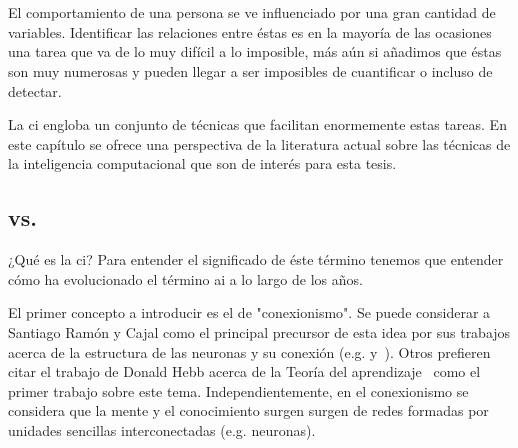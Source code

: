 \chapter{}
\label{ch:sota-ci}

El comportamiento de una persona se ve influenciado por una gran cantidad de variables. Identificar las relaciones entre éstas es en la mayoría de las ocasiones una tarea que va de lo muy difícil a lo imposible, más aún si añadimos que éstas son muy numerosas y pueden llegar a ser imposibles de cuantificar o incluso de detectar.

La \ac{ci} engloba un conjunto de técnicas que facilitan enormemente estas tareas. En este capítulo se ofrece una perspectiva de la literatura actual sobre las técnicas de la inteligencia computacional que son de interés para esta tesis.

\section{ vs. }

¿Qué es la \ac{ci}? Para entender el significado de éste término tenemos que entender cómo ha evolucionado el término \ac{ai} a lo largo de los años.

El primer concepto a introducir es el de "conexionismo". Se puede considerar a Santiago Ramón y Cajal como el principal precursor de esta idea por sus trabajos acerca de la estructura de las neuronas y su conexión (e.g. \cite{y1888estructura} y~\cite{ramon1904textura}). Otros prefieren citar el trabajo de Donald Hebb acerca de la Teoría del aprendizaje~\cite{hebb19680} como el primer trabajo sobre este tema. Independientemente, en el conexionismo se considera que la mente y el conocimiento surgen surgen de redes formadas por unidades sencillas interconectadas (e.g. neuronas).

